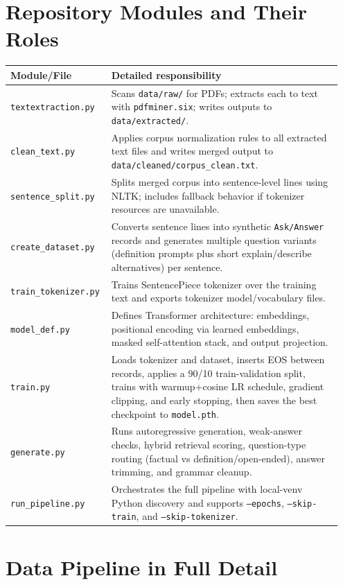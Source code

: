 \documentclass[a4paper,11pt]{article}
\begin{document}
\section{Repository Modules and Their Roles}
\begin{longtable}{>{\raggedright\arraybackslash}p{0.27\linewidth} >{\raggedright\arraybackslash}p{0.68\linewidth}}
\toprule
\textbf{Module/File} & \textbf{Detailed responsibility} \\
\midrule
\texttt{textextraction.py} & Scans \texttt{data/raw/} for PDFs; extracts each to text with \texttt{pdfminer.six}; writes outputs to \texttt{data/extracted/}. \\
\texttt{clean\_text.py} & Applies corpus normalization rules to all extracted text files and writes merged output to \texttt{data/cleaned/corpus\_clean.txt}. \\
\texttt{sentence\_split.py} & Splits merged corpus into sentence-level lines using NLTK; includes fallback behavior if tokenizer resources are unavailable. \\
\texttt{create\_dataset.py} & Converts sentence lines into synthetic \texttt{Ask/Answer} records and generates multiple question variants (definition prompts plus short explain/describe alternatives) per sentence. \\
\texttt{train\_tokenizer.py} & Trains SentencePiece tokenizer over the training text and exports tokenizer model/vocabulary files. \\
\texttt{model\_def.py} & Defines Transformer architecture: embeddings, positional encoding via learned embeddings, masked self-attention stack, and output projection. \\
\texttt{train.py} & Loads tokenizer and dataset, inserts EOS between records, applies a 90/10 train-validation split, trains with warmup+cosine LR schedule, gradient clipping, and early stopping, then saves the best checkpoint to \texttt{model.pth}. \\
\texttt{generate.py} & Runs autoregressive generation, weak-answer checks, hybrid retrieval scoring, question-type routing (factual vs definition/open-ended), answer trimming, and grammar cleanup. \\
\texttt{run\_pipeline.py} & Orchestrates the full pipeline with local-venv Python discovery and supports \texttt{--epochs}, \texttt{--skip-train}, and \texttt{--skip-tokenizer}. \\
\bottomrule
\end{longtable}

\section{Data Pipeline in Full Detail}
\end{document}
